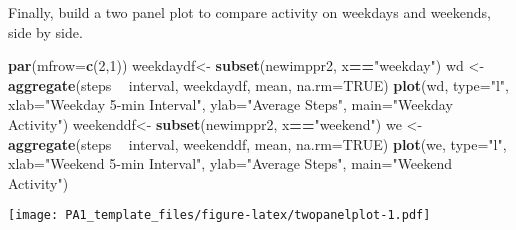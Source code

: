 \documentclass[]{article}
\newenvironment{Shaded}{\begin{snugshade}}{\end{snugshade}}
\newcommand{\KeywordTok}[1]{\textcolor[rgb]{0.13,0.29,0.53}{\textbf{#1}}}
\newcommand{\DataTypeTok}[1]{\textcolor[rgb]{0.13,0.29,0.53}{#1}}
\newcommand{\DecValTok}[1]{\textcolor[rgb]{0.00,0.00,0.81}{#1}}
\newcommand{\StringTok}[1]{\textcolor[rgb]{0.31,0.60,0.02}{#1}}
\newcommand{\OtherTok}[1]{\textcolor[rgb]{0.56,0.35,0.01}{#1}}
\newcommand{\OperatorTok}[1]{\textcolor[rgb]{0.81,0.36,0.00}{\textbf{#1}}}
\newcommand{\NormalTok}[1]{#1}
\begin{document}
Finally, build a two panel plot to compare activity on weekdays and
weekends, side by side.

\begin{Shaded}
\begin{Highlighting}[]
\KeywordTok{par}\NormalTok{(}\DataTypeTok{mfrow=}\KeywordTok{c}\NormalTok{(}\DecValTok{2}\NormalTok{,}\DecValTok{1}\NormalTok{))}
\NormalTok{weekdaydf<-}\StringTok{ }\KeywordTok{subset}\NormalTok{(newimppr2, x}\OperatorTok{==}\StringTok{"weekday"}\NormalTok{)}
\NormalTok{wd <-}\StringTok{ }\KeywordTok{aggregate}\NormalTok{(steps }\OperatorTok{~}\StringTok{ }\NormalTok{interval, weekdaydf, mean, }\DataTypeTok{na.rm=}\OtherTok{TRUE}\NormalTok{)}
\KeywordTok{plot}\NormalTok{(wd, }\DataTypeTok{type=}\StringTok{"l"}\NormalTok{, }\DataTypeTok{xlab=}\StringTok{"Weekday 5-min Interval"}\NormalTok{, }\DataTypeTok{ylab=}\StringTok{"Average Steps"}\NormalTok{, }\DataTypeTok{main=}\StringTok{"Weekday Activity"}\NormalTok{)}
\NormalTok{weekenddf<-}\StringTok{ }\KeywordTok{subset}\NormalTok{(newimppr2, x}\OperatorTok{==}\StringTok{"weekend"}\NormalTok{)}
\NormalTok{we <-}\StringTok{ }\KeywordTok{aggregate}\NormalTok{(steps }\OperatorTok{~}\StringTok{ }\NormalTok{interval, weekenddf, mean, }\DataTypeTok{na.rm=}\OtherTok{TRUE}\NormalTok{)}
\KeywordTok{plot}\NormalTok{(we, }\DataTypeTok{type=}\StringTok{"l"}\NormalTok{, }\DataTypeTok{xlab=}\StringTok{"Weekend 5-min Interval"}\NormalTok{, }\DataTypeTok{ylab=}\StringTok{"Average Steps"}\NormalTok{, }\DataTypeTok{main=}\StringTok{"Weekend Activity"}\NormalTok{)}
\end{Highlighting}
\end{Shaded}

\texttt{[image: PA1\_template\_files/figure-latex/twopanelplot-1.pdf]}
\end{document}
